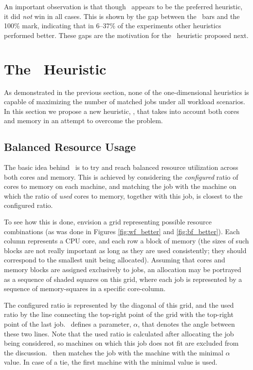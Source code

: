 An important observation is that though \wfc\ appears to be the preferred heuristic, 
it did \textit{not} win in all cases. 
This is shown by the gap between the \wfc\ bars 
and the 100\% mark, indicating that in 6--37\% of the experiments
other heuristics performed better. 
These gaps are the motivation for the \mif\ heuristic
proposed next. 


\chapter{The \mif\ Heuristic}
\label{sec:mixed-fit}

As demonstrated in the previous section, none of the one-dimensional
heuristics is capable of maximizing the number of matched jobs under
all workload scenarios.
In this section we propose a new heuristic, \mif, that takes into
account both cores and memory in an attempt to overcome the problem.


\section{Balanced Resource Usage}

The basic idea behind \mif\ is to try and reach balanced resource
utilization across both cores and memory.
This is achieved by considering the \textit{configured} ratio of cores
to memory on each machine, and matching the job with the machine on
which the ratio of \textit{used} cores to memory, together with this
job, is closest to the configured ratio.

To see how this is done, envision a grid representing possible
resource combinations (as was done in Figures \ref{fig:wf_better} and
\ref{fig:bf_better}).
Each column represents a CPU core, and each row a block of memory (the
sizes of such blocks are not really important as long as they are used
consistently; they should correspond to the smallest unit being
allocated).
Assuming that cores and memory blocks are assigned exclusively to
jobs, an allocation may be portrayed as a sequence of shaded squares
on this grid, where each job is represented by a sequence of
memory-squares in a specific core-column.

The configured ratio is represented by the diagonal of this grid, and
the used ratio by the line connecting the top-right point of the grid
with the top-right point of the last job.
\mif\ defines a parameter, $\alpha$, that denotes the angle between
these two lines.
Note that the used ratio is calculated after allocating the job being
considered, so machines on which this job does not fit are excluded
from the discussion.
\mif\ then matches the job with the machine with the minimal $\alpha$
value.
In case of a tie, the first machine with the minimal value is used.

